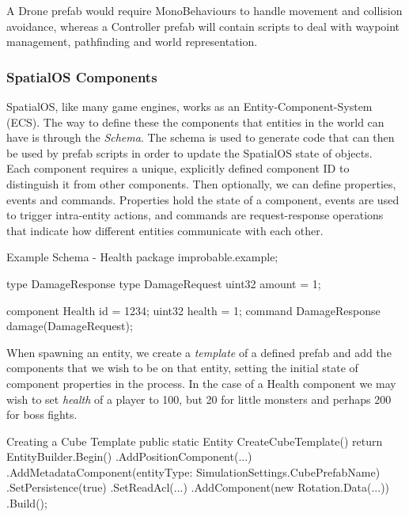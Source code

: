 \documentclass[a4paper,12pt,titlepage]{article}
\begin{document}
A Drone prefab would require MonoBehaviours to handle movement and collision avoidance, whereas a Controller prefab will contain scripts to deal with waypoint management, pathfinding and world representation.

\subsubsection{SpatialOS Components}
SpatialOS, like many game engines, works as an Entity-Component-System (ECS). The way to define these the components that entities in the world can have is through the \textit{Schema}. The schema is used to generate code that can then be used by prefab scripts in order to update the SpatialOS state of objects.\\

Each component requires a unique, explicitly defined component ID to distinguish it from other components. Then optionally, we can define properties, events and commands. Properties hold the state of a component, events are used to trigger intra-entity actions, and commands are request-response operations that indicate how different entities communicate with each other.

\begin{sexylisting}[colback=white]{Example Schema - Health}
package improbable.example;

type DamageResponse {}
type DamageRequest {
  uint32 amount = 1;
}

component Health {
  id = 1234;
  uint32 health = 1;
  command DamageResponse damage(DamageRequest);
}
\end{sexylisting}

When spawning an entity, we create a \textit{template} of a defined prefab and add the components that we wish to be on that entity, setting the initial state of component properties in the process. In the case of a Health component we may wish to set \textit{health} of a player to 100, but 20 for little monsters and perhaps 200 for boss fights.\\

\begin{sexylisting}[colback=white]{Creating a Cube Template}
public static Entity CreateCubeTemplate()
{
  return EntityBuilder.Begin()
    .AddPositionComponent(...)
    .AddMetadataComponent(entityType: SimulationSettings.CubePrefabName)
    .SetPersistence(true)
    .SetReadAcl(...)
    .AddComponent(new Rotation.Data(...))
    .Build();
}
\end{sexylisting}
\end{document}
